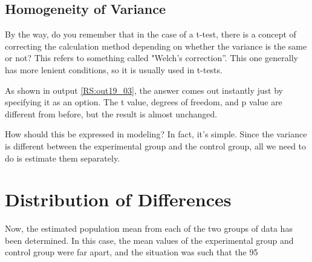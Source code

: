 \documentclass{ltjsbook}
\begin{document}
\subsection{Homogeneity of Variance}
By the way, do you remember that in the case of a t-test, there is a concept of correcting the calculation method depending on whether the variance is the same or not?
This refers to something called "Welch's correction”. This one generally has more lenient conditions, so it is usually used in t-tests.

As shown in output \ref{RS:out19_03}, the answer comes out instantly just by specifying it as an option. The t value, degrees of freedom, and p value are different from before, but the result is almost unchanged.

How should this be expressed in modeling? In fact, it's simple. Since the variance is different between the experimental group and the control group, all we need to do is estimate them separately.



\section{Distribution of Differences}
\label{ROPE}
Now, the estimated population mean from each of the two groups of data has been determined. In this case, the mean values of the experimental group and control group were far apart, and the situation was such that the 95%
\end{document}
